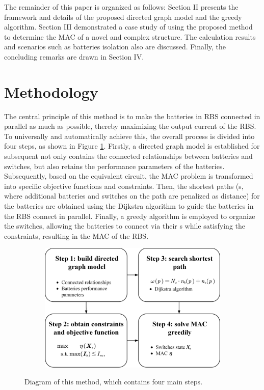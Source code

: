 \documentclass{article}
\begin{document}
The remainder of this paper is organized as follows: 
Section II presents the framework and details of the proposed directed graph model and the greedy algorithm. 
Section III demonstrated a case study of using the proposed method to determine the MAC of a novel and complex structure. 
The calculation results  and scenarios such as batteries isolation also are discussed. 
Finally, the concluding remarks are drawn in Section IV.

\section{Methodology}

The central principle of this method is to make the batteries in RBS connected in parallel as much as possible, thereby maximizing the output current of the RBS.
To universally and automatically achieve this, the overall process is divided into four steps, as shown in Figure \ref{fig:main}.
Firstly, a directed graph model is established for subsequent   not only contains the connected relationships between batteries and switches, but also retains the performance parameters of the batteries.
Subsequently, based on the equivalent circuit, the MAC problem is transformed into specific objective functions and constraints.
Then, the shortest paths (s, where additional batteries and switches on the path are penalized as distance) for the batteries are obtained using the Dijkstra algorithm to guide the batteries in the RBS connect in parallel.
Finally, a greedy algorithm is employed to organize the switches, allowing the batteries to connect via their s while satisfying the constraints, resulting in the MAC of the RBS.

\begin{figure}[htbp]
    \centering
    \begin{subfigure}[b]{0.8\textwidth}
        \includegraphics[width=\textwidth]{main.png}
    \end{subfigure}
    \caption{ 
        Diagram of this method, which contains four main steps.
    }
    \label{fig:main}
\end{figure}
\end{document}
